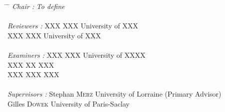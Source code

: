 \begin{titlepage}
\begin{addmargin}[-1cm]{-3cm}
        \begin{center}
        \vspace{1.5em}
        \begin{tabbing}
        \hspace{3cm} \= \hspace{5cm} \= \kill
        \textit{Chair :} \> \textit{To define} \\
        \\
        \textit{Reviewers :} \> XXX \textsc{XXX} \> University of XXX \\
        \> XXX \textsc{XXX} \> University of XXX \\
        \\
        \textit{Examiners :} \> XXX \textsc{XXX} \> University of XXXX \\
        \> XXX \textsc{XX} \> XXX \\
        \> XXX \textsc{XXX} \> XXX \\
        \\
        \textit{Supervisors :} \> Stephan \textsc{Merz} \> University of Lorraine (Primary Advisor) \\
        \> Gilles \textsc{Dowek} \> University of Paris-Saclay \\
        \end{tabbing}
        \end{center}
  \end{addmargin}
\end{titlepage}   